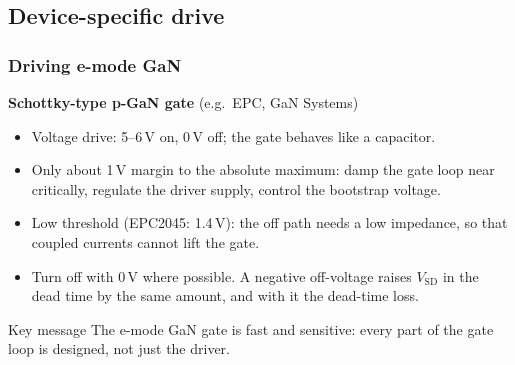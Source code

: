 \subsection{Device-specific drive}

\begin{frame}
	\frametitle{Driving e-mode GaN}
	\textbf{Schottky-type p-GaN gate} (e.g.\ EPC, GaN Systems)
	\begin{itemize}
		\item Voltage drive: 5--6\,V on, 0\,V off; the gate behaves like a capacitor.
		\item Only about 1\,V margin to the absolute maximum: damp the gate loop near critically, regulate the driver supply, control the bootstrap voltage.
		\item Low threshold (EPC2045: 1.4\,V): the off path needs a low impedance, so that coupled currents cannot lift the gate.
		\item Turn off with 0\,V where possible. A negative off-voltage raises $V_\mathrm{SD}$ in the dead time by the same amount, and with it the dead-time loss.
	\end{itemize}
	\begin{block}{Key message}
		The e-mode GaN gate is fast and sensitive: every part of the gate loop is designed, not just the driver.
	\end{block}
\end{frame}

